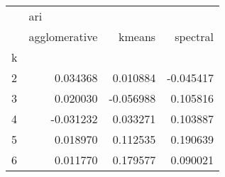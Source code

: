 \begin{tabular}{lrrr}
\toprule
{} & \multicolumn{3}{l}{ari} \\
{} & agglomerative &    kmeans &  spectral \\
k &               &           &           \\
\midrule
2 &      0.034368 &  0.010884 & -0.045417 \\
3 &      0.020030 & -0.056988 &  0.105816 \\
4 &     -0.031232 &  0.033271 &  0.103887 \\
5 &      0.018970 &  0.112535 &  0.190639 \\
6 &      0.011770 &  0.179577 &  0.090021 \\
\bottomrule
\end{tabular}
